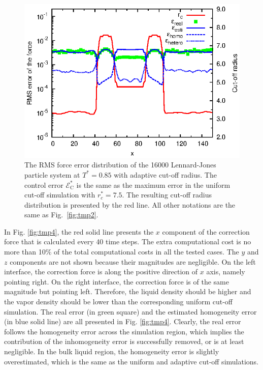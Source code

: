 \documentclass[aps, pre, preprint]{revtex4}
\begin{document}
\begin{figure}
  \centering
  \includegraphics[]{figs/rcut.and.error.eps}
  \caption{ The RMS force error distribution of the 16000
    Lennard-Jones particle system at $T^\ast=0.85$ with adaptive
    cut-off radius. The control error $\mathcal E^\ast_{\textrm{C}}$
    is the same as the maximum error in the uniform cut-off simulation
    with $r_c^\ast=7.5$.  The resulting cut-off radius distribution is
    presented by the red line. All other notations are the same as
    Fig.~\ref{fig:tmp2}.}
  \label{fig:tmp3}
\end{figure}


In Fig. \ref{fig:tmp4}, the red solid line presents the $x$ component
of the 
correction force that is calculated every 40 time steps.
The extra computational cost is no more than 10\% of the total
computational costs in all the tested cases.
The $y$ and
$z$ components are not shown because their magnitudes are negligible.
On the left interface, the correction force is along the positive
direction of $x$ axis, namely pointing right.  On the right interface,
the correction force is of the same magnitude but pointing
left. Therefore, the liquid density should be higher and the vapor
density should be lower than the corresponding uniform cut-off
simulation.  The real error (in green square) and the estimated
homogeneity error (in blue solid line) are all presented in
Fig. \ref{fig:tmp4}.  Clearly, the real error follows the homogeneity
error across the simulation region, which implies the contribution of
the inhomogeneity error is successfully removed, or is at least
negligible. In the bulk liquid region, the homogeneity error is
slightly overestimated, which is the same as the uniform and adaptive
cut-off simulations.
\end{document}
